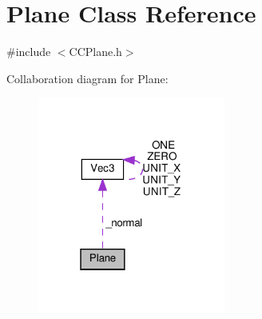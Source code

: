 \hypertarget{classPlane}{}\section{Plane Class Reference}
\label{classPlane}


{\ttfamily \#include $<$C\+C\+Plane.\+h$>$}



Collaboration diagram for Plane\+:
\nopagebreak
\begin{figure}[H]
\begin{center}
\leavevmode
\includegraphics[width=175pt]{classPlane__coll__graph}
\end{center}
\end{figure}

